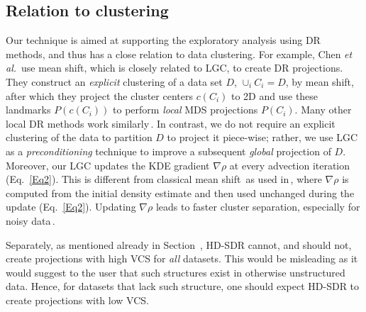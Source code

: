 \documentclass[sagev,Afour,times]{sagej}
\begin{document}
\subsection{Relation to clustering}
Our technique is aimed at supporting the exploratory analysis using DR methods, and thus has a close relation to data clustering. For example, Chen \emph{et al.}\,\cite{realworld:banknote_sep} use mean shift, which is closely related to LGC, to create DR projections. They construct an \emph{explicit} clustering of a data set $D$, $\cup_i C_i = D$, by mean shift, after which they project the cluster centers $c(C_i)$ to 2D and use these landmarks $P(c(C_i))$ to perform \emph{local} MDS projections $P(C_i)$. Many other local DR methods work similarly\,\cite{lamp:original,nonato18}. In contrast, we do not require an explicit clustering of the data to partition $D$ to project it piece-wise; rather, we use LGC as a \emph{preconditioning} technique to improve a subsequent \emph{global} projection of $D$. Moreover, our LGC updates the KDE gradient $\nabla \rho$ at every advection iteration (Eq.~\ref{Eq2}). This is different from classical mean shift\,\cite{gc1975} as used in\,\cite{realworld:banknote_sep}, where $\nabla \rho$ is computed from the initial density estimate and then used unchanged during the update (Eq.~\ref{Eq2}). Updating $\nabla \rho$ leads to faster cluster separation, especially for noisy data\,\cite{alex1,cubu}.

Separately, as mentioned already in Section~, HD-SDR cannot, and should not, create projections with high VCS for \emph{all} datasets. This would be misleading as it would suggest to the user that such structures exist in otherwise unstructured data. Hence, for datasets that lack such structure, one should expect HD-SDR to create projections with low VCS.

\end{document}
